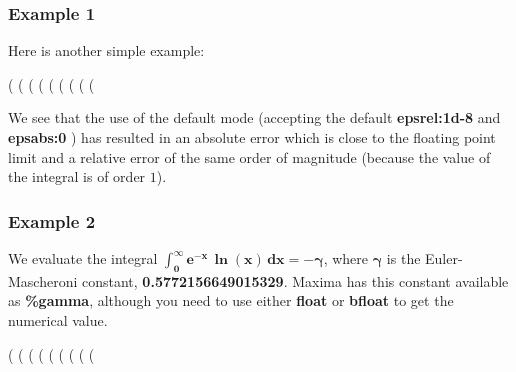 \documentclass[12pt]{article}
\begin{document}
\subsubsection*{Example 1}
Here is another simple example:
\begin{myVerbatim}
(%
(%
(%
(%
(%
(%
(%
(%
(%
\end{myVerbatim} 
We see that the use of the default mode (accepting the default \textbf{epsrel:1d-8}
  and \textbf{epsabs:0} ) has resulted in an absolute error which is close to
  the floating point limit and a relative error of the same order of magnitude
  (because the value of the integral is of order $1$). 
\subsubsection*{Example 2}
We evaluate the integral $\mathbf{\int_{0}^{\infty}e^{-x}\,\boldsymbol{\ln}(x)\,dx = -\boldsymbol{\gamma}}$, where
  $\boldsymbol{\gamma}$ is the Euler-Mascheroni constant, \textbf{0.5772156649015329}.
Maxima has this constant available as \textbf{\%gamma}, although you need to use
  either \textbf{float} or \textbf{bfloat} to get the numerical value.
\begin{myVerbatim}
(%
(%
(%
(%
(%
(%
(%
(%
(%
\end{myVerbatim}
\end{document}
